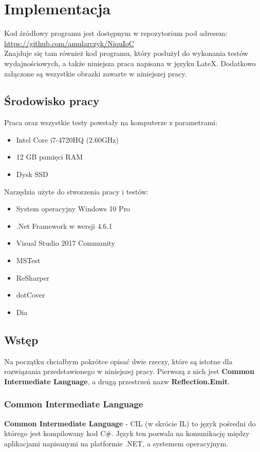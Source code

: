 \documentclass[12pt]{article}
\begin{document}
\clearpage
\section{Implementacja}
Kod źródłowy programu jest dostępnym w repozytorium pod adresem:\\
\url{https://github.com/amularczyk/NiquIoC}\\
Znajduje się tam również kod programu, który posłużył do wykonania testów wydajnościowych, a także niniejsza praca napisana w języku LateX. Dodatkowo załączone są wszystkie obrazki zawarte w niniejszej pracy.

\subsection{Środowisko pracy}
Praca oraz wszystkie testy powstały na komputerze z parametrami:
\begin{itemize}
	\item Intel Core i7-4720HQ (2.60GHz)
	\item 12 GB pamięci RAM
	\item Dysk SSD
\end{itemize}
Narzędzia użyte do stworzenia pracy i testów:
\begin{itemize}
	\item System operacyjny Windows 10 Pro
	\item .Net Framework w wersji 4.6.1
	\item Visual Studio 2017 Community
	\item MSTest
	\item ReSharper
	\item dotCover
	\item Dia
\end{itemize}


\subsection{Wstęp}
Na początku chciałbym pokrótce opisać dwie rzeczy, które są istotne dla rozwiązania przedstawionego w niniejszej pracy. Pierwszą z nich jest \textbf{Common Intermediate Language}, a drugą przestrzeń nazw \textbf{Reflection.Emit}.

\subsubsection{Common Intermediate Language}
\textbf{Common Intermediate Language} - CIL (w skrócie IL) to język pośredni do którego jest kompilowany kod C\#. Język ten pozwala na komunikację między aplikacjami napisanymi na platformie .NET, a systemem operacyjnym.
\end{document}
